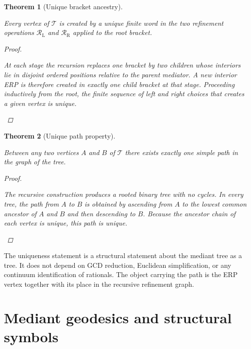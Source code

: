 \documentclass[11pt, letterpaper]{article}
\theoremstyle{definition}
\theoremstyle{plain}
\newtheorem{theorem}{Theorem}[section]
\begin{document}
\begin{theorem}[Unique bracket ancestry]
\begin{rsbox}
Every vertex of $\mathcal{T}$ is created by a unique finite word in the two
refinement operations $\mathcal{R}_{\mathrm{L}}$ and
$\mathcal{R}_{\mathrm{R}}$ applied to the root bracket.
\end{rsbox}
\begin{proof}
\begin{rsbox}
At each stage the recursion replaces one bracket by two children whose interiors
lie in disjoint ordered positions relative to the parent mediator.  A new
interior ERP is therefore created in exactly one child bracket at that stage.
Proceeding inductively from the root, the finite sequence of left and right
choices that creates a given vertex is unique.
\end{rsbox}
\end{proof}

\end{theorem}

\begin{theorem}[Unique path property]
\begin{rsbox}
Between any two vertices $A$ and $B$ of $\mathcal{T}$ there exists exactly one
simple path in the graph of the tree.
\end{rsbox}
\begin{proof}
\begin{rsbox}
The recursive construction produces a rooted binary tree with no cycles.  In
every tree, the path from $A$ to $B$ is obtained by ascending from $A$ to the
lowest common ancestor of $A$ and $B$ and then descending to $B$.  Because the
ancestor chain of each vertex is unique, this path is unique.
\end{rsbox}
\end{proof}

\end{theorem}

\begin{observebox}
The uniqueness statement is a structural statement about the mediant tree as a
tree.  It does not depend on GCD reduction, Euclidean simplification, or any
continuum identification of rationals.  The object carrying the path is the ERP
vertex together with its place in the recursive refinement graph.
\end{observebox}

\section{Mediant geodesics and structural symbols}
\end{document}
